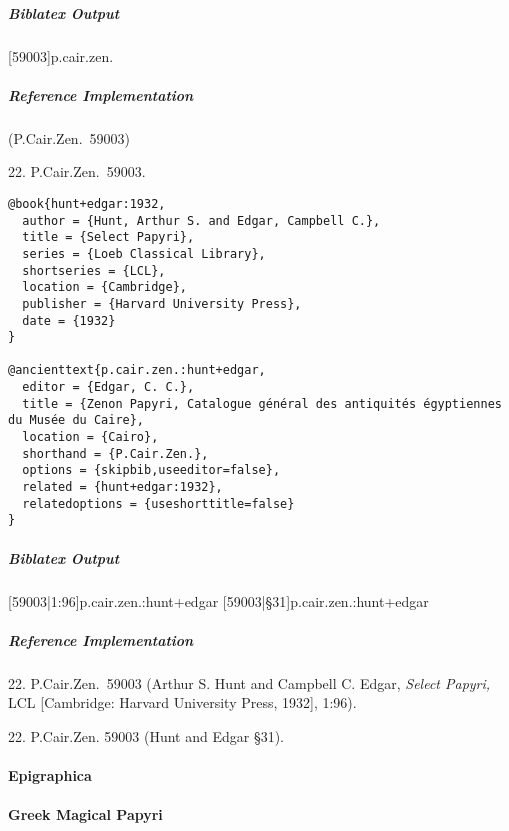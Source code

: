 \documentclass[a4paper]{article}
\newenvironment{biboutput}{%
  \subparagraph{Biblatex Output}
}{\color{black}}
\newenvironment{refimp}{%
  \subparagraph{Reference Implementation}
  \color{reference-colour}
  \rm
}{\par\color{black}}
\begin{document}
\begin{biboutput}
  [59003]{p.cair.zen.}
\end{biboutput}

\begin{refimp}
  (P.Cair.Zen.\ 59003)

  \hspace*{\bibindent}22. P.Cair.Zen.\ 59003.
\end{refimp}

\medskip

\begin{lstlisting}
@book{hunt+edgar:1932,
  author = {Hunt, Arthur S. and Edgar, Campbell C.},
  title = {Select Papyri},
  series = {Loeb Classical Library},
  shortseries = {LCL},
  location = {Cambridge},
  publisher = {Harvard University Press},
  date = {1932}
}

@ancienttext{p.cair.zen.:hunt+edgar,
  editor = {Edgar, C. C.},
  title = {Zenon Papyri, Catalogue général des antiquités égyptiennes du Musée du Caire},
  location = {Cairo},
  shorthand = {P.Cair.Zen.},
  options = {skipbib,useeditor=false},
  related = {hunt+edgar:1932},
  relatedoptions = {useshorttitle=false}
}
\end{lstlisting}

\begin{biboutput}
  [59003|1:96]{p.cair.zen.:hunt+edgar}
  [59003|§31]{p.cair.zen.:hunt+edgar}
\end{biboutput}

\begin{refimp}
  \hspace*{\bibindent}22. P.Cair.Zen.\ 59003 (Arthur S. Hunt and Campbell C.
  Edgar, \emph{Select Papyri,} LCL [Cambridge: Harvard University Press,
  1932], 1:96).

  \hspace*{\bibindent}22. P.Cair.Zen. 59003 (Hunt and Edgar §31).

\end{refimp}

\paragraph{Epigraphica}

\paragraph{Greek Magical Papyri}
\end{document}
